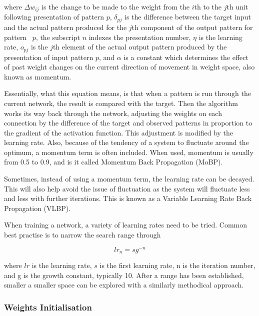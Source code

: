 where $\Delta w_{ij}$ is the change to be made to the weight from the $i$th to the $j$th unit following presentation of pattern $p$, $\delta_{pj}$ is the difference between the target input and the actual pattern produced for the $j$th component of the output pattern for pattern ~$p$, the subscript $n$ indexes the presentation number, $\eta$ is the learning rate, $o_{pj}$ is the $j$th element of the actual output pattern produced by the presentation of input pattern $p$, and $\alpha$ is a constant which determines the effect of past weight changes on the current direction of movement in weight space, also known as momentum.

Essentially, what this equation means, is that when a pattern is run through the current network, the result is compared with the target. Then the algorithm works its way back through the network, adjusting the weights on each connection by the difference of the target and observed patterns in proportion to the gradient of the activation function. This adjustment is modified by the learning rate. Also, because of the tendency of a system to fluctuate around the optimum, a momentum term is often included\cite{Rumelhart_error_propagation}. When used, momentum is usually from 0.5 to 0.9, and is it called Momentum Back Propagation (MoBP).

Sometimes, instead of using a momentum term, the learning rate can be decayed\cite{LeCun_backprop}. This will also help avoid the issue of fluctuation as the system will fluctuate less and less with further iterations. This is known as a Variable Learning Rate Back Propagation (VLBP).

When training a network, a variety of learning rates need to be tried. Common best practise is to narrow the search range through 

\begin{equation}
    lr_n = s g^{-n}
\end{equation}

where $lr$ is the learning rate, $s$ is the first learning rate, n is the iteration number, and g is the growth constant, typically 10\cite{Goodfellow_deeplearning}. After a range has been established, smaller a smaller space can be explored with a similarly methodical approach.

\subsubsection{Weights Initialisation}\label{subsec:weights}

